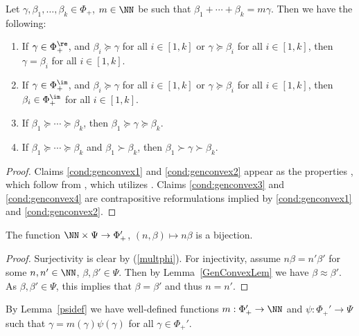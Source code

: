 \begin{lemma} \label{GenConvexLem} \cite{KlCuspSys, BaKaTiAffMir}
Let \(\gamma, \beta_1, \ldots, \beta_k \in \Phi_+\), \(m \in \NN\) be such that \(\beta_1 + \cdots + \beta_k = m \gamma\). Then we have the following:
\begin{enumerate}
\item If \(\gamma \in \Phi_+^\re\), and \(\beta_i \succeq \gamma\) for all \(i \in [1,k]\) or \(\gamma \succeq \beta_i\) for all \(i \in [1,k]\), then \(\gamma = \beta_i\) for all \(i \in [1,k]\). \label{cond:genconvex1}
\item If \(\gamma \in \Phi_+^\im\), and \(\beta_i \succeq \gamma\) for all \(i \in [1,k]\) or \(\gamma \succeq \beta_i\) for all \(i \in [1,k]\), then \(\beta_i \in \Phi_+^\im\) for all \(i \in [1,k]\). \label{cond:genconvex2}
\item If \(\beta_1 \succeq \cdots \succeq \beta_k\), then \(\beta_1 \succeq \gamma \succeq \beta_k\). \label{cond:genconvex3}
\item If \(\beta_1 \succeq \cdots \succeq \beta_k\) and \(\beta_1 \succ \beta_k\), then \(\beta_1 \succ \gamma \succ \beta_k\). \label{cond:genconvex4}
\end{enumerate}
\end{lemma}
\begin{proof}
Claims \eqref{cond:genconvex1} and \eqref{cond:genconvex2} appear as the properties \cite[(Con1), (Con3)]{KlCuspSys}, which follow from \cite[Lemma 3.1]{KlCuspSys}, which utilizes \cite[Lemma 2.9]{BaKaTiAffMir}. Claims \eqref{cond:genconvex3} and \eqref{cond:genconvex4} are contrapositive reformulations implied by \eqref{cond:genconvex1} and \eqref{cond:genconvex2}.
\end{proof}


\begin{lemma} \label{psidef} 
The function \(\NN \times \Psi \to \Phi_+'\), \((n, \beta) \mapsto n \beta\) is a bijection.
\end{lemma}
\begin{proof}
Surjectivity is clear by (\ref{multphi}). For injectivity, assume \(n \beta = n' \beta'\) for some \(n,n' \in \NN\), \(\beta,\beta' \in \Psi\). Then by Lemma~\ref{GenConvexLem} we have \(\beta \approx \beta'\). As \(\beta, \beta' \in \Psi\), this implies that \(\beta = \beta'\) and thus \(n = n'\).
\end{proof}

By Lemma~\ref{psidef} we have well-defined functions \(m:\Phi_+' \to \NN\) and \(\psi: \Phi_+' \to \Psi\) such that \(\gamma = m(\gamma) \psi(\gamma)\) for all \(\gamma \in \Phi_+'\).


